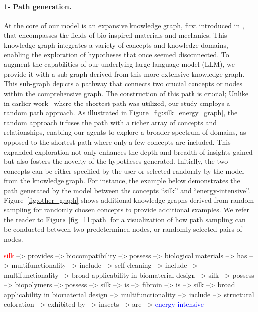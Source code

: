 \documentclass{article}
\begin{document}
\paragraph{1- Path generation.} At the core of our model is an expansive knowledge graph, first introduced in \cite{buehler2024accelerating}, that encompasses the fields of bio-inspired materials and mechanics. This knowledge graph integrates a variety of concepts and knowledge domains, enabling the exploration of hypotheses that once seemed disconnected. To augment the capabilities of our underlying large language model (LLM), we provide it with a sub-graph derived from this more extensive knowledge graph. This sub-graph depicts a pathway that connects two crucial concepts or nodes within the comprehensive graph. The construction of this path is crucial; Unlike in earlier work~\cite{buehler2024accelerating} where the shortest path was utilized, our study employs a random path approach. As illustrated in Figure~\ref{fig:silk_energy_graph}, the random approach infuses the path with a richer array of concepts and relationships, enabling our agents to explore a broader spectrum of domains, as opposed to the shortest path where only a few concepts are included. This expanded exploration not only enhances the depth and breadth of insights gained but also fosters the novelty of the hypotheses generated. Initially, the two concepts can be either specified by the user or selected randomly by the model from the knowledge graph. For instance, the example below demonstrates the path generated by the model between the concepts ``silk'' and ``energy-intensive''. Figure~\ref{fig:other_graph} shows additional knowledge graphs derived from random sampling for randomly chosen concepts to provide additional examples. We refer the reader to Figure~\ref{fig_11:path} for a visualization of how path sampling can be conducted between two predetermined nodes, or randomly selected pairs of nodes.

\begin{Box1}[colbacktitle={black!20!white}, colback={white!10!white}]{}
\textcolor{red}{silk} --> provides --> biocompatibility --> possess --> biological materials --> has --> multifunctionality --> include --> self-cleaning --> include --> multifunctionality --> broad applicability in biomaterial design --> silk --> possess --> biopolymers --> possess --> silk --> is --> fibroin --> is --> silk --> broad applicability in biomaterial design --> multifunctionality --> include --> structural coloration --> exhibited by --> insects -->
are --> \textcolor{blue}{energy-intensive}
\end{Box1}
\end{document}
